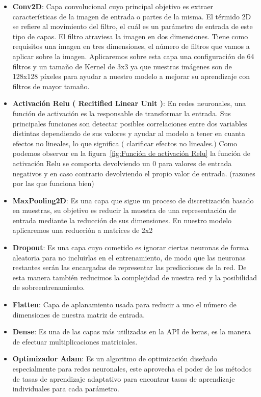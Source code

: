 \begin{itemize}
    \item \textbf{Conv2D}: Capa convolucional cuyo principal objetivo es extraer características de la imagen de entrada o partes de la misma.
    El térmido 2D se refiere al movimiento del filtro, el cuál es un parámetro de entrada de este tipo de capas.
    El filtro atraviesa la imagen en dos dimensiones.
    Tiene como requisitos una imagen en tres dimensiones, el número de filtros que vamos a aplicar sobre la imagen.
    Aplicaremos sobre esta capa una configuración de 64 filtros y un tamaño de Kernel de 3x3 ya que nuestras imágenes son de 128x128 píxeles para ayudar a nuestro modelo a mejorar su aprendizaje con filtros de mayor tamaño.
    \item \textbf{Activación Relu ( Recitified Linear Unit )}: En redes neuronales, una función de activación es la responsable de transformar la entrada.
    Sus principales funciones son detectar posibles correlaciones entre dos variables distintas dependiendo de sus valores y ayudar al modelo a tener en cuanta efectos no lineales, lo que significa ( clarificar efectos no lineales.)
    Como podemos observar en la figura~\ref{fig:Función de activación Relu} la función de activación Relu se comporta devolviendo un 0 para valores de entrada negativos y en caso contrario devolviendo el propio valor de entrada. (razones por las que funciona bien)
    \item \textbf{MaxPooling2D}: Es una capa que sigue un proceso de discretización basado en muestras, su objetivo es reducir la muestra de una representación de entrada mediante la reducción de sus dimensiones.
    En nuestro modelo aplicaremos una reducción a matrices de 2x2
    \item \textbf{Dropout}: Es una capa cuyo cometido es ignorar ciertas neuronas de forma aleatoria para no incluirlas en el entrenamiento, de modo que las neuronas restantes serán las encargadas de representar las predicciones de la red.
    De esta manera también reducimos la complejidad de nuestra red y la posibilidad de sobreentrenamiento.
    \item \textbf{Flatten}: Capa de aplanamiento usada para reducir a uno el número de dimensiones de nuestra matriz de entrada.
    \item \textbf{Dense}: Es una de las capas más utilizadas en la API de keras, es la manera de efectuar multiplicaciones matriciales.
    \item \textbf{Optimizador Adam}: Es un algoritmo de optimización diseñado especialmente para redes neuronales, este aprovecha el poder de los métodos de tasas de aprendizaje adaptativo para encontrar tasas de aprendizaje individuales para cada parámetro.
\end{itemize}

